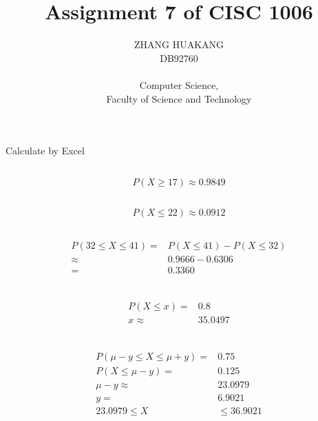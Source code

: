\documentclass{article}
\title{Assignment 7 of CISC 1006}
\author{ZHANG HUAKANG \\ DB92760 \\ \\ Computer Science, \\Faculty of Science and Technology}
\begin{document}
    \maketitle
    \section{}
    Calculate by Excel
        \subsection{}
            $$P(X\geq 17)\approx 0.9849$$
        \subsection{}
            $$P(X\leq 22)\approx 0.0912$$
        \subsection{}
            \begin{equation*}
                \begin{split}
                    P(32\leq X\leq 41)=&P(X\leq 41)-P(X\leq 32)\\
                        \approx& 0.9666-0.6306\\
                        =&0.3360\\
                \end{split}
            \end{equation*}
        \subsection{}
            \begin{equation*}
                \begin{split}
                    P(X\leq x)=&0.8\\
                    x\approx& 35.0497\\
                \end{split}
            \end{equation*}
        \subsection{}
            \begin{equation*}
                \begin{split}
                    P(\mu-y\leq X \leq \mu+y)=& 0.75\\
                    P(X\leq \mu-y)=&0.125\\
                    \mu-y\approx & 23.0979\\
                    y=&6.9021\\
                    23.0979\leq X&\leq 36.9021\\
                \end{split}
            \end{equation*}
\end{document}
